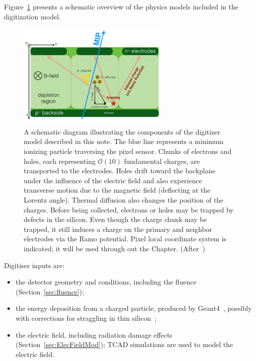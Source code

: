 Figure~\ref{fig:app:raddamge1} presents a schematic overview of the physics models included in the digitization model.   
\begin{figure}[htpb!]
\centering
\includegraphics[width=0.65\textwidth]{New3DigitizerSchematic.pdf}
\caption{A schematic diagram illustrating the components of the digitizer model described in this note.  The blue line represents a minimum ionizing particle traversing the pixel sensor.  Chunks of electrons and holes, each representing $\mathcal{O}(10)$ fundamental charges, are transported to the electrodes.  Holes drift toward the backplane under the influence of the electric field and also experience transverse motion due to the magnetic field (deflecting at the Lorentz angle).  Thermal diffusion also changes the position of the charges.  Before being collected, electrons or holes may be trapped by defects in the silicon.  Even though the charge chunk may be trapped, it still induces a charge on the primary and neighbor electrodes via the Ramo potential. Pixel local coordinate system is indicated; it will be used through out the Chapter. (After~\cite{Benoit:2255825})}
\label{fig:app:raddamge1}
\end{figure}

Digitiser inputs are:
\begin{itemize}

\item the detector geometry and conditions, including the fluence (Section~\ref{sec:fluence});
\item the  energy deposition from a charged particle, produced by Geant4~\cite{Agostinelli:2002hh}, possibly with corrections for straggling in thin silicon~\cite{Bichsel:1988if};
\item the electric field, including radiation damage effects (Section~\ref{sec:ElecFieldMod}); TCAD simulations are used to model the electric field.
 \end{itemize}
 
